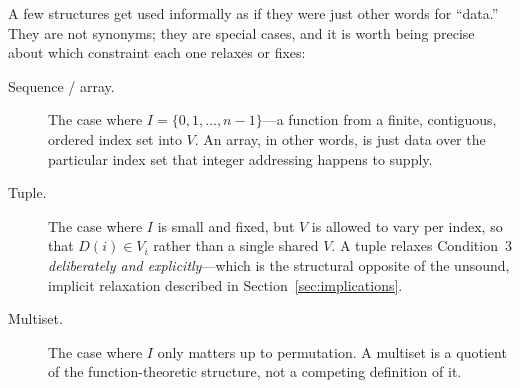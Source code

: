A few structures get used informally as if they were just other words for
``data.'' They are not synonyms; they are special cases, and it is worth
being precise about which constraint each one relaxes or fixes:

\begin{description}
  \item[Sequence / array.]
    The case where $I = \{0, 1, \dots, n-1\}$---a function from a finite,
    contiguous, ordered index set into $V$. An array, in other words, is
    just data over the particular index set that integer addressing
    happens to supply.
  \item[Tuple.]
    The case where $I$ is small and fixed, but $V$ is allowed to vary
    per index, so that $D(i) \in V_i$ rather than a single shared $V$.
    A tuple relaxes Condition~3 \emph{deliberately and explicitly}---which
    is the structural opposite of the unsound, implicit relaxation
    described in Section~\ref{sec:implications}.
  \item[Multiset.]
    The case where $I$ only matters up to permutation. A multiset is a
    quotient of the function-theoretic structure, not a competing
    definition of it.
\end{description}